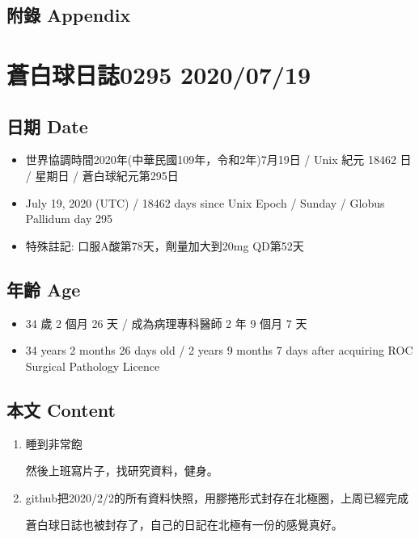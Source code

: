 \documentclass[
]{article}
\providecommand{\tightlist}{%
  \setlength{\itemsep}{0pt}\setlength{\parskip}{0pt}}
\begin{document}
\hypertarget{ux9644ux9304-appendix-16}{%
\subsection{附錄 Appendix}\label{ux9644ux9304-appendix-16}}

\hypertarget{ux84bcux767dux7403ux65e5ux8a8c0295-20200719}{%
\section{蒼白球日誌0295
2020/07/19}\label{ux84bcux767dux7403ux65e5ux8a8c0295-20200719}}

\hypertarget{ux65e5ux671f-date-17}{%
\subsection{日期 Date}\label{ux65e5ux671f-date-17}}

\begin{itemize}
\tightlist
\item
  世界協調時間2020年(中華民國109年，令和2年)7月19日 / Unix 紀元 18462 日
  / 星期日 / 蒼白球紀元第295日
\item
  July 19, 2020 (UTC) / 18462 days since Unix Epoch / Sunday / Globus
  Pallidum day 295
\item
  特殊註記: 口服A酸第78天，劑量加大到20mg QD第52天
\end{itemize}

\hypertarget{ux5e74ux9f61-age-17}{%
\subsection{年齡 Age}\label{ux5e74ux9f61-age-17}}

\begin{itemize}
\tightlist
\item
  34 歲 2 個月 26 天 / 成為病理專科醫師 2 年 9 個月 7 天
\item
  34 years 2 months 26 days old / 2 years 9 months 7 days after
  acquiring ROC Surgical Pathology Licence
\end{itemize}

\hypertarget{ux672cux6587-content-17}{%
\subsection{本文 Content}\label{ux672cux6587-content-17}}

\begin{enumerate}
\def\labelenumi{\arabic{enumi}.}
\item
  睡到非常飽

  然後上班寫片子，找研究資料，健身。
\item
  github把2020/2/2的所有資料快照，用膠捲形式封存在北極圈，上周已經完成

  蒼白球日誌也被封存了，自己的日記在北極有一份的感覺真好。
\end{enumerate}
\end{document}

